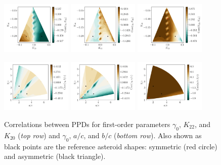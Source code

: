 \documentclass[fleqn,usenatbib]{mnras}
\begin{document}
\begin{figure}
  \includegraphics[width=0.3\textwidth]{figs/probe-space-corr12.pdf}\hfill
  \includegraphics[width=0.3\textwidth]{figs/probe-space-corr13.pdf}\hfill
  \includegraphics[width=0.3\textwidth]{figs/probe-space-corr23.pdf}

  \includegraphics[width=0.3\textwidth]{figs/probe-space-ab-1b.pdf}\hfill
  \includegraphics[width=0.3\textwidth]{figs/probe-space-ab-1a.pdf}\hfill
  \includegraphics[width=0.3\textwidth]{figs/probe-space-ab-ab.pdf}
  
  \caption{Correlations between PPDs for first-order parameters $\gamma_0$, $K_{22}$, and $K_{20}$ (\textit{top row}) and $\gamma_0$, $a/c$, and $b/c$ (\textit{bottom row}).  Also shown as black points are the reference asteroid shapes: symmetric (red circle) and asymmetric (black triangle).}
  \label{fig:scan-space-corr}
\end{figure}
\end{document}
